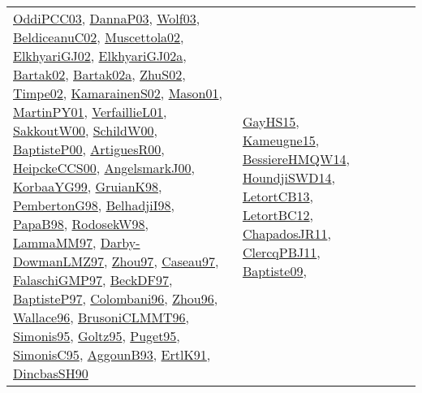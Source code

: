 {\begin{longtable}{lp{3cm}>{\raggedright}p{6cm}>{\raggedright}p{6cm}p{8cm}}
\href{papers/OddiPCC03.pdf}{OddiPCC03}\cite{OddiPCC03}, \href{papers/DannaP03.pdf}{DannaP03}\cite{DannaP03}, \href{papers/Wolf03.pdf}{Wolf03}\cite{Wolf03}, \href{papers/BeldiceanuC02.pdf}{BeldiceanuC02}\cite{BeldiceanuC02}, \href{papers/Muscettola02.pdf}{Muscettola02}\cite{Muscettola02}, \href{papers/ElkhyariGJ02.pdf}{ElkhyariGJ02}\cite{ElkhyariGJ02}, \href{papers/ElkhyariGJ02a.pdf}{ElkhyariGJ02a}\cite{ElkhyariGJ02a}, \href{papers/Bartak02.pdf}{Bartak02}\cite{Bartak02}, \href{papers/Bartak02a.pdf}{Bartak02a}\cite{Bartak02a}, \href{papers/ZhuS02.pdf}{ZhuS02}\cite{ZhuS02}, \href{articles/Timpe02.pdf}{Timpe02}\cite{Timpe02}, \href{papers/KamarainenS02.pdf}{KamarainenS02}\cite{KamarainenS02}, \href{articles/Mason01.pdf}{Mason01}\cite{Mason01}, \href{articles/MartinPY01.pdf}{MartinPY01}\cite{MartinPY01}, \href{papers/VerfaillieL01.pdf}{VerfaillieL01}\cite{VerfaillieL01}, \href{articles/SakkoutW00.pdf}{SakkoutW00}\cite{SakkoutW00}, \href{articles/SchildW00.pdf}{SchildW00}\cite{SchildW00}, \href{articles/BaptisteP00.pdf}{BaptisteP00}\cite{BaptisteP00}, \href{articles/ArtiguesR00.pdf}{ArtiguesR00}\cite{ArtiguesR00}, \href{articles/HeipckeCCS00.pdf}{HeipckeCCS00}\cite{HeipckeCCS00}, \href{papers/AngelsmarkJ00.pdf}{AngelsmarkJ00}\cite{AngelsmarkJ00}, \href{papers/KorbaaYG99.pdf}{KorbaaYG99}\cite{KorbaaYG99}, \href{papers/GruianK98.pdf}{GruianK98}\cite{GruianK98}, \href{papers/PembertonG98.pdf}{PembertonG98}\cite{PembertonG98}, \href{articles/BelhadjiI98.pdf}{BelhadjiI98}\cite{BelhadjiI98}, \href{articles/PapaB98.pdf}{PapaB98}\cite{PapaB98}, \href{papers/RodosekW98.pdf}{RodosekW98}\cite{RodosekW98}, \href{articles/LammaMM97.pdf}{LammaMM97}\cite{LammaMM97}, \href{articles/Darby-DowmanLMZ97.pdf}{Darby-DowmanLMZ97}\cite{Darby-DowmanLMZ97}, \href{articles/Zhou97.pdf}{Zhou97}\cite{Zhou97}, \href{papers/Caseau97.pdf}{Caseau97}\cite{Caseau97}, \href{articles/FalaschiGMP97.pdf}{FalaschiGMP97}\cite{FalaschiGMP97}, \href{papers/BeckDF97.pdf}{BeckDF97}\cite{BeckDF97}, \href{papers/BaptisteP97.pdf}{BaptisteP97}\cite{BaptisteP97}, \href{papers/Colombani96.pdf}{Colombani96}\cite{Colombani96}, \href{papers/Zhou96.pdf}{Zhou96}\cite{Zhou96}, \href{articles/Wallace96.pdf}{Wallace96}\cite{Wallace96}, \href{papers/BrusoniCLMMT96.pdf}{BrusoniCLMMT96}\cite{BrusoniCLMMT96}, \href{papers/Simonis95.pdf}{Simonis95}\cite{Simonis95}, \href{papers/Goltz95.pdf}{Goltz95}\cite{Goltz95}, \href{papers/Puget95.pdf}{Puget95}\cite{Puget95}, \href{papers/SimonisC95.pdf}{SimonisC95}\cite{SimonisC95}, \href{articles/AggounB93.pdf}{AggounB93}\cite{AggounB93}, \href{papers/ErtlK91.pdf}{ErtlK91}\cite{ErtlK91}, \href{articles/DincbasSH90.pdf}{DincbasSH90}\cite{DincbasSH90} & \href{papers/GayHS15.pdf}{GayHS15}\cite{GayHS15}, \href{articles/Kameugne15.pdf}{Kameugne15}\cite{Kameugne15}, \href{papers/BessiereHMQW14.pdf}{BessiereHMQW14}\cite{BessiereHMQW14}, \href{papers/HoundjiSWD14.pdf}{HoundjiSWD14}\cite{HoundjiSWD14}, \href{papers/LetortCB13.pdf}{LetortCB13}\cite{LetortCB13}, \href{papers/LetortBC12.pdf}{LetortBC12}\cite{LetortBC12}, \href{papers/ChapadosJR11.pdf}{ChapadosJR11}\cite{ChapadosJR11}, \href{papers/ClercqPBJ11.pdf}{ClercqPBJ11}\cite{ClercqPBJ11}, \href{papers/Baptiste09.pdf}{Baptiste09}\cite{Baptiste09}, 
\end{longtable}}
